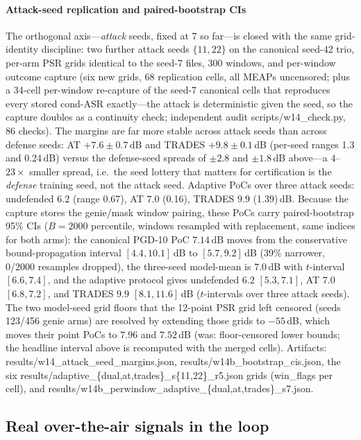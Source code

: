 \documentclass[review]{elsarticle}
\begin{document}
\paragraph{Attack-seed replication and paired-bootstrap CIs}
\label{par:attackseed}
The orthogonal axis---\emph{attack} seeds, fixed at 7 so far---is closed
with the same grid-identity discipline: two further attack seeds
$\{11,22\}$ on the canonical seed-42 trio, per-arm PSR grids identical
to the seed-7 files, 300 windows, and per-window outcome capture (six
new grids, 68 replication cells, all MEAPs uncensored; plus a 34-cell
per-window re-capture of the seed-7 canonical cells that reproduces
every stored cond-ASR exactly---the attack is deterministic given the
seed, so the capture doubles as a continuity check; independent audit
scripts/w14\_check.py, 86 checks). The margins are far more stable
across attack seeds than across defense seeds: AT $+7.6\pm0.7$\,dB and
TRADES $+9.8\pm0.1$\,dB (per-seed ranges 1.3 and 0.24\,dB) versus the
defense-seed spreads of $\pm2.8$ and $\pm1.8$\,dB above---a
$4$--$23\times$ smaller spread, i.e.\ the seed lottery that matters for
certification is the \emph{defense} training seed, not the attack seed.
Adaptive PoCs over three attack seeds: undefended $6.2$ (range 0.67),
AT $7.0$ (0.16), TRADES $9.9$ (1.39)\,dB. Because the capture stores
the genie/mask window pairing, these PoCs carry paired-bootstrap 95\%
CIs ($B{=}2000$ percentile, windows resampled with replacement, same
indices for both arms): the canonical PGD-10 PoC $7.14$\,dB moves from
the conservative bound-propagation interval $[4.4,10.1]$\,dB to
$[5.7,9.2]$\,dB (39\% narrower, 0/2000 resamples dropped), the
three-seed model-mean is $7.0$\,dB with $t$-interval $[6.6,7.4]$, and
the adaptive protocol gives undefended $6.2$ $[5.3,7.1]$, AT $7.0$
$[6.8,7.2]$, and TRADES $9.9$ $[8.1,11.6]$\,dB ($t$-intervals over
three attack seeds). The two model-seed grid floors that the
12-point PSR grid left censored (seeds 123/456 genie arms) are resolved
by extending those grids to $-55$\,dB, which moves their point PoCs to
$7.96$ and $7.52$\,dB (was: floor-censored lower bounds; the headline
interval above is recomputed with the merged cells). Artifacts:
results/w14\_attack\_seed\_margins.json,
results/w14b\_bootstrap\_cis.json, the six
results/adaptive\_\{dual,at,trades\}\_s\{11,22\}\_r5.json grids
(win\_flags per cell), and
results/w14b\_perwindow\_adaptive\_\{dual,at,trades\}\_s7.json.

\subsection{Real over-the-air signals in the loop}
\label{sec:realwifi}
\end{document}
